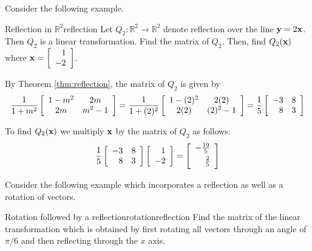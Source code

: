 Consider the following example. 

\begin{example}{Reflection in $\mathbb{R}^2$}{reflection}
Let $Q_2: \mathbb{R}^2 \to \mathbb{R}^2$ denote reflection over the line ${\bf y}=2{\bf x}$. Then $Q_2$ is a linear transformation. Find the matrix of $Q_2$. Then, find $Q_2 ({\bf x})$ where ${\bf x} = \left[ 
\begin{array}{r}
1 \\
-2
\end{array}
\right]$. 
\end{example}

\begin{solution}
By Theorem \ref{thm:reflection}, the matrix of $Q_2$ is given by 
\[
\frac{1}{1+m^2}
\left[
\begin{array}{cc}
1-m^2 & 2m \\
2m & m^2-1 
\end{array}
\right]
=
\frac{1}{1+(2)^2}
\left[
\begin{array}{cc}
1-(2)^2 & 2(2) \\
2(2) & (2)^2-1 
\end{array}
\right]
=
\frac{1}{5}
\left[
\begin{array}{rr}
-3 & 8 \\
8 & 3 
\end{array}
\right]
\]

To find $Q_2({\bf x})$ we multiply ${\bf x}$ by the matrix of $Q_2$ as follows:
\[
\frac{1}{5}
\leftB
\begin{array}{rr}
-3 & 8 \\
8 & 3 
\end{array}
\rightB
\leftB
\begin{array}{r}
1 \\
-2
\end{array}
\rightB
=
\leftB
\begin{array}{r}
-\vspace{0.05in}\frac{19}{5} \\
\vspace{0.05in}\frac{2}{5}
\end{array}
\rightB
\]

\end{solution}

Consider the following example which incorporates a reflection as well as a rotation of vectors.

\begin{example}{Rotation followed by a reflection}{rotationreflection}
Find the matrix of the linear transformation which is obtained by first
rotating all vectors through an angle of $\pi /6$ and then reflecting
through the $x$ axis.
\end{example}

